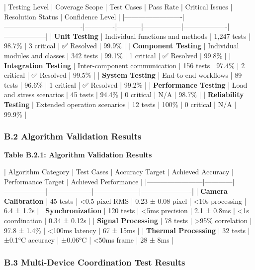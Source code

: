 \documentclass[12pt,a4paper]{article}
\begin{document}
| Testing Level           | Coverage Scope                   | Test Cases  | Pass Rate | Critical Issues | Resolution Status | Confidence Level |
|-------------------------|----------------------------------|-------------|-----------|-----------------|-------------------|------------------|
| \textbf{Unit Testing}        | Individual functions and methods | 1,247 tests | 98.7\%     | 3 critical      | ✅ Resolved        | 99.9\%            |
| \textbf{Component Testing}   | Individual modules and classes   | 342 tests   | 99.1\%     | 1 critical      | ✅ Resolved        | 99.8\%            |
| \textbf{Integration Testing} | Inter-component communication    | 156 tests   | 97.4\%     | 2 critical      | ✅ Resolved        | 99.5\%            |
| \textbf{System Testing}      | End-to-end workflows             | 89 tests    | 96.6\%     | 1 critical      | ✅ Resolved        | 99.2\%            |
| \textbf{Performance Testing} | Load and stress scenarios        | 45 tests    | 94.4\%     | 0 critical      | N/A               | 98.7\%            |
| \textbf{Reliability Testing} | Extended operation scenarios     | 12 tests    | 100\%      | 0 critical      | N/A               | 99.9\%            |

\subsubsection{B.2 Algorithm Validation Results}

\textbf{Table B.2.1: Algorithm Validation Results}

| Algorithm Category     | Test Cases | Accuracy Target  | Achieved Accuracy | Performance Target | Achieved Performance |
|------------------------|------------|------------------|-------------------|--------------------|----------------------|
| \textbf{Camera Calibration} | 45 tests   | <0.5 pixel RMS   | 0.23 ± 0.08 pixel | <10s processing    | 6.4 ± 1.2s           |
| \textbf{Synchronization}    | 120 tests  | <5ms precision   | 2.1 ± 0.8ms       | <1s coordination   | 0.34 ± 0.12s         |
| \textbf{Signal Processing}  | 78 tests   | >95\% correlation | 97.8 ± 1.4\%       | <100ms latency     | 67 ± 15ms            |
| \textbf{Thermal Processing} | 32 tests   | ±0.1°C accuracy  | ±0.06°C           | <50ms frame        | 28 ± 8ms             |

\subsubsection{B.3 Multi-Device Coordination Test Results}
\end{document}
